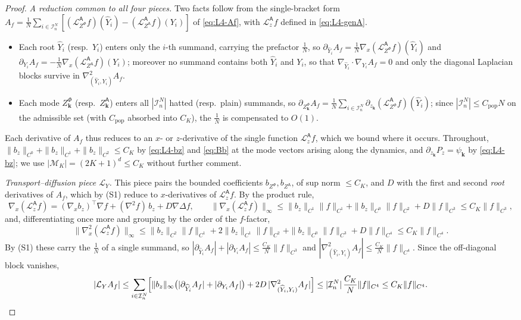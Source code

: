 \documentclass[a4paper,fleqn]{cas-sc}
\theoremstyle{definition}
\theoremstyle{remark}
\begin{document}
\begin{proof}
\emph{A reduction common to all four pieces.}
Two facts follow from the single-bracket form
$A_f=\frac1N\sum_{i\in\mathcal I^N_n}[(\mathcal L^{\mathsf A}_{Z^\Phi}f)(\widehat Y_i)-(\mathcal L^{\mathsf A}_{Z^{\mathsf A}}f)(Y_i)]$ of
\eqref{eq:L4-Af}, with $\mathcal L^{\mathsf A}_zf$ defined in \eqref{eq:L4-genA}.
\begin{itemize}
\item[(S1)] Each root $\widehat Y_i$ (resp.\ $Y_i$) enters only the $i$-th summand, carrying the
prefactor $\tfrac1N$, so $\partial_{\widehat Y_i}A_f=\tfrac1N\nabla_x(\mathcal L^{\mathsf A}_{Z^\Phi}f)(\widehat Y_i)$ and
$\partial_{Y_i}A_f=-\tfrac1N\nabla_x(\mathcal L^{\mathsf A}_{Z^{\mathsf A}}f)(Y_i)$; moreover no summand contains both
$\widehat Y_i$ and $Y_i$, so that $\nabla_{\widehat Y_i}\!\cdot\!\nabla_{Y_i}A_f=0$ and only the diagonal
Laplacian blocks survive in $\nabla^2_{(\widehat Y_i,Y_i)}A_f$.
\item[(S2)] Each mode $Z^\Phi_{\mathbf k}$ (resp.\ $Z^{\mathsf A}_{\mathbf k}$) enters all
$|\mathcal I^N_n|$ hatted (resp.\ plain) summands, so
$\partial_{Z^\Phi_{\mathbf k}}A_f=\tfrac1N\sum_{i\in\mathcal I^N_n}\partial_{z_{\mathbf k}}(\mathcal L^{\mathsf A}_{Z^\Phi}f)(\widehat Y_i)$;
since $|\mathcal I^N_n|\le C_{\mathrm{pop}}N$ on the admissible set (with $C_{\mathrm{pop}}$ absorbed into $C_K$), the $\tfrac1N$ is
compensated to $O(1)$.
\end{itemize}
Each derivative of $A_f$ thus reduces to an $x$- or $z$-derivative of the single function $\mathcal L^{\mathsf A}_zf$, which
we bound where it occurs. Throughout, $\|b_z\|_{C^0}+\|b_z\|_{C^1}+\|b_z\|_{C^2}\le C_K$ by
\eqref{eq:L4-bz} and \eqref{eq:Bb} at the mode vectors arising along the dynamics, and
$\partial_{z_{\mathbf k}}P_z=\psi_{\mathbf k}$ by \eqref{eq:L4-bz}; we use $|\mathcal M_K|=(2K+1)^d\le C_K$
without further comment.

\emph{Transport--diffusion piece $\mathcal L_Y$.}
This piece pairs the bounded coefficients $b_{Z^\Phi},b_{Z^{\mathsf A}}$, of sup norm
$\le C_K$, and $D$ with the first and second \emph{root} derivatives of $A_f$, which by
(S1) reduce to $x$-derivatives of $\mathcal L^{\mathsf A}_zf$. By the product rule,
\[
\nabla_x(\mathcal L^{\mathsf A}_zf)=(\nabla_xb_z)^{\!\top}\nabla f+(\nabla^2f)\,b_z+D\nabla\Delta f,
\qquad
\|\nabla_x(\mathcal L^{\mathsf A}_zf)\|_\infty\le\|b_z\|_{C^1}\|f\|_{C^1}+\|b_z\|_{C^0}\|f\|_{C^2}+D\|f\|_{C^3}\le C_K\|f\|_{C^3},
\]
and, differentiating once more and grouping by the order of the $f$-factor,
\[
\|\nabla^2_x(\mathcal L^{\mathsf A}_zf)\|_\infty
\le\|b_z\|_{C^2}\|f\|_{C^1}+2\|b_z\|_{C^1}\|f\|_{C^2}+\|b_z\|_{C^0}\|f\|_{C^3}+D\|f\|_{C^4}\le C_K\|f\|_{C^4}.
\]
By (S1) these carry the $\tfrac1N$ of a single summand, so
$|\partial_{\widehat Y_i}A_f|+|\partial_{Y_i}A_f|\le\tfrac{C_K}N\|f\|_{C^3}$ and
$|\nabla^2_{(\widehat Y_i,Y_i)}A_f|\le\tfrac{C_K}N\|f\|_{C^4}$. Since the off-diagonal block vanishes,
\[
|\mathcal L_YA_f|
\le\sum_{i\in\mathcal I^N_n}\Bigl[\|b_z\|_\infty\bigl(|\partial_{\widehat Y_i}A_f|+|\partial_{Y_i}A_f|\bigr)
+2D\,|\nabla^2_{(\widehat Y_i,Y_i)}A_f|\Bigr]
\le|\mathcal I^N_n|\,\frac{C_K}N\|f\|_{C^4}\le C_K\|f\|_{C^4}.
\]


\end{proof}
\end{document}
